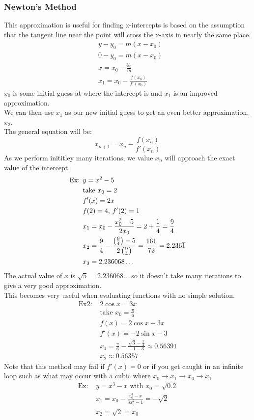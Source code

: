 \documentclass[11pt, fleqn]{article}
\begin{document}
\subsubsection{Newton's Method}
This approximation is useful for finding x-intercepts is based on the assumption that the tangent line near the point will cross the x-axis in nearly the same place.
\begin{align*}
    &y-y_0=m(x-x_0)\\
    &0-y_0=m(x-x_0)\\
    &x=x_0-\frac{y_0}{m}\\
    &x_1=x_0-\frac{f(x_0)}{f'(x_0)}
\end{align*}
$x_0$ is some initial guess at where the intercept is and $x_1$ is an improved approximation.\\
We can then use $x_1$ as our new initial guess to get an even better approximation, $x_2$.\\
The general equation will be:
$$x_{n+1}=x_n-\frac{f(x_n)}{f'(x_n)}$$
As we perform inititley many iterations, we value $x_n$ will approach the exact value of the intercept.
\begin{align*}
    \text{Ex: }&y=x^2-5\\
    &\text{take }x_0=2\\
    &f'(x)=2x\\
    &f(2)=4,\,f'(2)=1\\
    &x_1=x_0-\frac{x_0^2-5}{2x_0}=2+\frac{1}{4}=\frac{9}{4}\\
    &x_2=\frac{9}{4}-\frac{\left( \frac{9}{4} \right)-5}{2\left( \frac{9}{4} \right)}=\frac{161}{72}=2.236\overline{1}\\
    &x_3=2.236068\ldots
\end{align*}
The actual value of $x$ is $\sqrt{5}=2.236068\ldots$ so it doesn't take many iterations to give a very good approximation.\\
This becomes very useful when evaluating functions with no simple solution.
\begin{align*}
    \text{Ex2: }&2\cos x=3x\\
    &\text{take }x_0=\frac{\pi}{6}\\
    &f(x)=2\cos x-3x\\
    &f'(x)=-2\sin x-3\\
    &x_1=\frac{\pi}{6}-\frac{\sqrt{3}-\frac{\pi}{2}}{-1-3}\approx 0.56391\\
    &x_2\approx 0.56357
\end{align*}
Note that this method may fail if $f'(x)=0$ or if you get caught in an infinite loop such as what may occur with a cubic where $x_0\to x_1\to x_0\to x_1$
\begin{align*}
    \text{Ex: }&y=x^3-x\text{ with }x_0=\sqrt{0.2}\\
    &x_1=x_0-\frac{x_0^3-x}{3x_0^2-1}=-\sqrt{2}\\
    &x_2=\sqrt{2}=x_0
\end{align*}
\end{document}
